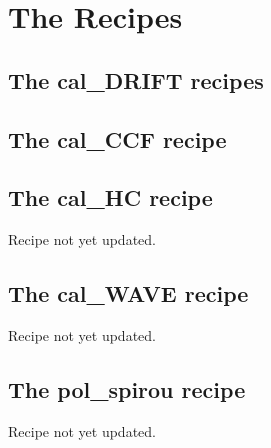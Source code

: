 \chapter{The Recipes}
\label{ch:the_recipes}
















\clearpage
\newpage
\section{The cal\_DRIFT recipes}
\label{ch:the_recipes:cal_DRIFT_RAW_spirou}


\clearpage
\newpage
\section{The cal\_CCF recipe}
\label{ch:the_recipes:cal_CCF_E2DS_spirou}





\clearpage
\newpage
\section{The cal\_HC recipe}
\label{ch:the_recipes:cal_HC_E2DS_spirou}

Recipe not yet updated.


\section{The cal\_WAVE recipe}
\label{ch:the_recipes:cal_WAVE_E2DS_spirou}

Recipe not yet updated.


\section{The pol\_spirou recipe}
\label{ch:the_recipes:pol_spirou}

Recipe not yet updated.
